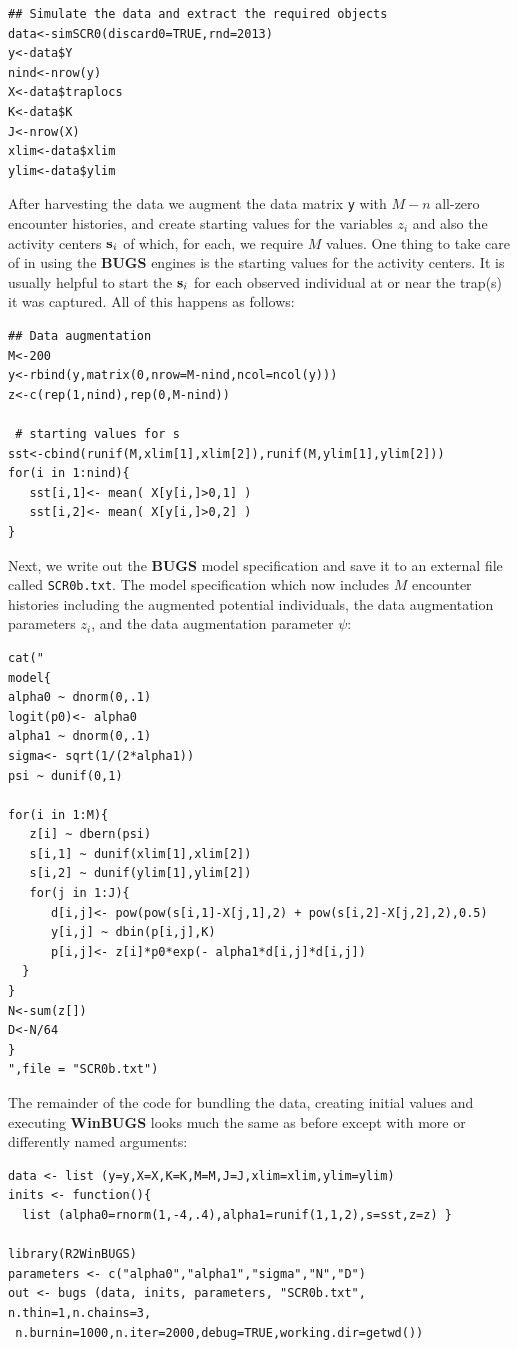 {\small
\begin{verbatim}
## Simulate the data and extract the required objects
data<-simSCR0(discard0=TRUE,rnd=2013)
y<-data$Y
nind<-nrow(y)
X<-data$traplocs
K<-data$K
J<-nrow(X)
xlim<-data$xlim
ylim<-data$ylim
\end{verbatim}
}
 After harvesting the data we
 augment the data matrix \mbox{\tt y}
with $M-n$ all-zero encounter histories, and create starting
values for the variables $z_{i}$ and also the activity centers ${\bf
  s}_{i}$ of which, for each, we require $M$ values.
 One thing to take care of in using the {\bf BUGS}
engines is the starting values for the activity centers. It is usually
helpful to start the ${\bf s}_{i}$ for each observed individual at or
near the trap(s) it was captured. All of this happens as follows:
{\small
\begin{verbatim}
## Data augmentation
M<-200
y<-rbind(y,matrix(0,nrow=M-nind,ncol=ncol(y)))
z<-c(rep(1,nind),rep(0,M-nind))

 # starting values for s
sst<-cbind(runif(M,xlim[1],xlim[2]),runif(M,ylim[1],ylim[2]))
for(i in 1:nind){
   sst[i,1]<- mean( X[y[i,]>0,1] )
   sst[i,2]<- mean( X[y[i,]>0,2] )
}
\end{verbatim}
}
Next, we write out the {\bf BUGS} model specification and save it to
an external file called \mbox{\tt SCR0b.txt}. The model
 specification which now includes $M$
encounter histories including the augmented potential individuals, the
data augmentation parameters $z_{i}$, and the data augmentation
parameter $\psi$:
{\small
\begin{verbatim}
cat("
model{
alpha0 ~ dnorm(0,.1)
logit(p0)<- alpha0
alpha1 ~ dnorm(0,.1)
sigma<- sqrt(1/(2*alpha1))
psi ~ dunif(0,1)

for(i in 1:M){
   z[i] ~ dbern(psi)
   s[i,1] ~ dunif(xlim[1],xlim[2])
   s[i,2] ~ dunif(ylim[1],ylim[2])
   for(j in 1:J){
      d[i,j]<- pow(pow(s[i,1]-X[j,1],2) + pow(s[i,2]-X[j,2],2),0.5)
      y[i,j] ~ dbin(p[i,j],K)
      p[i,j]<- z[i]*p0*exp(- alpha1*d[i,j]*d[i,j])
  }
}
N<-sum(z[])
D<-N/64
}
",file = "SCR0b.txt")
\end{verbatim}
}
The remainder of the code for bundling the data, creating initial
values and executing {\bf WinBUGS} looks much the same as before
except with more or differently named arguments:
{\small
\begin{verbatim}
data <- list (y=y,X=X,K=K,M=M,J=J,xlim=xlim,ylim=ylim)
inits <- function(){
  list (alpha0=rnorm(1,-4,.4),alpha1=runif(1,1,2),s=sst,z=z) }

library(R2WinBUGS)
parameters <- c("alpha0","alpha1","sigma","N","D")
out <- bugs (data, inits, parameters, "SCR0b.txt", n.thin=1,n.chains=3,
 n.burnin=1000,n.iter=2000,debug=TRUE,working.dir=getwd())
\end{verbatim}
}

